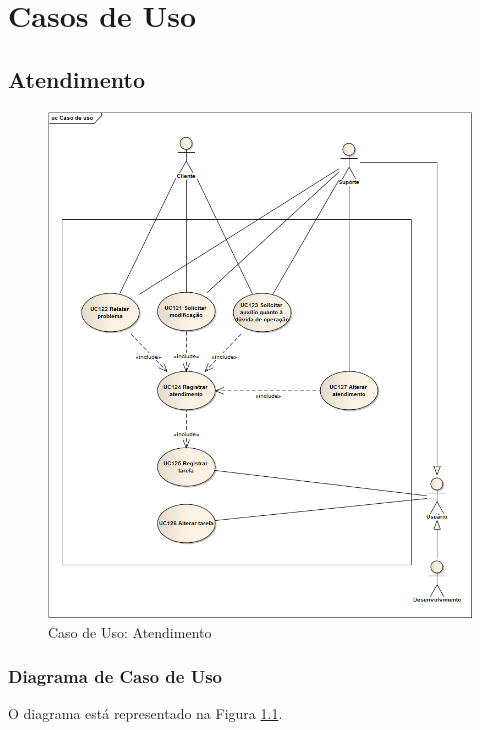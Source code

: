 
\chapter{Casos de Uso}

\section{Atendimento}
\label{Sec:uc:atendimento}

\begin{figure}[!h]
\centering
\includegraphics[scale=0.6]{figuras/UC_atendimento.png}
\caption{Caso de Uso: Atendimento}
\label{Fig:uc:atendimento}
\end{figure}

\subsection{Diagrama de Caso de Uso}

O diagrama está representado na Figura \ref{Fig:uc:atendimento}.

